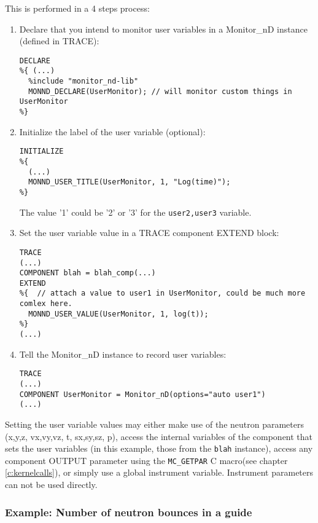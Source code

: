 This is performed in a 4 steps process:
\begin{enumerate}
\item Declare that you intend to monitor user variables in a Monitor\_nD instance (defined in TRACE):
\begin{lstlisting}
DECLARE
%{ (...)
  %include "monitor_nd-lib"
  MONND_DECLARE(UserMonitor); // will monitor custom things in UserMonitor
%}
\end{lstlisting}
\item Initialize the label of the user variable (optional):
\begin{lstlisting}
INITIALIZE
%{
  (...)
  MONND_USER_TITLE(UserMonitor, 1, "Log(time)");
%}
\end{lstlisting}
The value '1' could be '2' or '3' for the \verb+user2,user3+ variable.
\item Set the user variable value in a TRACE component EXTEND block:
\begin{lstlisting}
TRACE
(...)
COMPONENT blah = blah_comp(...)
EXTEND
%{  // attach a value to user1 in UserMonitor, could be much more comlex here.
  MONND_USER_VALUE(UserMonitor, 1, log(t));
%}
(...)
\end{lstlisting}
\item Tell the Monitor\_nD instance to record user variables:
\begin{lstlisting}
TRACE
(...)
COMPONENT UserMonitor = Monitor_nD(options="auto user1")
(...)
\end{lstlisting}
\end{enumerate}
Setting the user variable values may either make use of the neutron parameters (x,y,z, vx,vy,vz, t, sx,sy,sz, p), access the internal variables of the component that sets the user variables (in this example, those from the \verb+blah+ instance), access any component OUTPUT parameter  using the \verb+MC_GETPAR+ C macro(see chapter \ref{c:kernelcalls}), or simply use a global instrument variable. Instrument parameters can not be used directly.

\subsubsection{Example: Number of neutron bounces in a guide}

